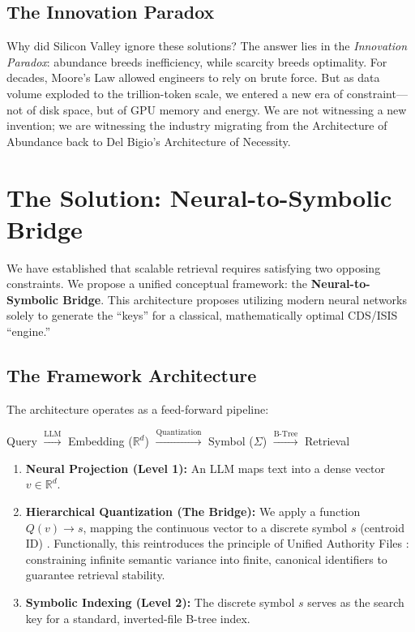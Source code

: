 \documentclass[manuscript,screen,review]{acmart}
\begin{document}
\subsection{The Innovation Paradox}

Why did Silicon Valley ignore these solutions? The answer lies in the \textit{Innovation Paradox}: abundance breeds inefficiency, while scarcity breeds optimality. For decades, Moore's Law allowed engineers to rely on brute force. But as data volume exploded to the trillion-token scale, we entered a new era of constraint---not of disk space, but of GPU memory and energy. We are not witnessing a new invention; we are witnessing the industry migrating from the Architecture of Abundance back to Del Bigio's Architecture of Necessity.

\section{The Solution: Neural-to-Symbolic Bridge}

We have established that scalable retrieval requires satisfying two opposing constraints. We propose a unified conceptual framework: the \textbf{Neural-to-Symbolic Bridge}. This architecture proposes utilizing modern neural networks solely to generate the ``keys'' for a classical, mathematically optimal CDS/ISIS ``engine.''

\subsection{The Framework Architecture}

The architecture operates as a feed-forward pipeline:

\begin{center}
Query $\xrightarrow{\text{LLM}}$ Embedding ($\mathbb{R}^d$) $\xrightarrow{\text{Quantization}}$ Symbol ($\Sigma$) $\xrightarrow{\text{B-Tree}}$ Retrieval
\end{center}

\begin{enumerate}
\item \textbf{Neural Projection (Level 1):} An LLM maps text into a dense vector $v \in \mathbb{R}^d$.
\item \textbf{Hierarchical Quantization (The Bridge):} We apply a function $Q(v) \rightarrow s$, mapping the continuous vector to a discrete symbol $s$ (centroid ID) \cite{zandieh2025}. Functionally, this reintroduces the principle of Unified Authority Files \cite{caprazli2003}: constraining infinite semantic variance into finite, canonical identifiers to guarantee retrieval stability.
\item \textbf{Symbolic Indexing (Level 2):} The discrete symbol $s$ serves as the search key for a standard, inverted-file B-tree index.
\end{enumerate}
\end{document}
